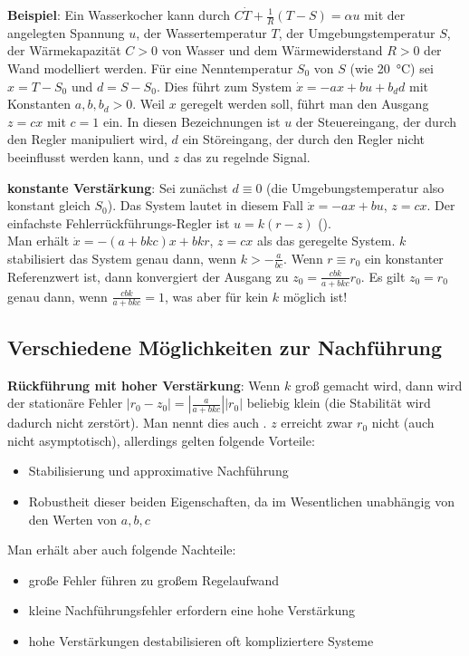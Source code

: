 \textbf{Beispiel}:
Ein Wasserkocher kann durch $C\dot{T} + \frac{1}{R} (T - S) = \alpha u$ mit
der angelegten Spannung $u$,
der Wassertemperatur $T$,
der Umgebungstemperatur $S$,
der Wärmekapazität $C > 0$ von Wasser und
dem Wärmewiderstand $R > 0$ der Wand modelliert werden.
Für eine Nenntemperatur $S_0$ von $S$ (wie \SI{20}{\celsius}) sei $x = T - S_0$ und $d = S - S_0$.
Dies führt zum System $\dot{x} = -ax + bu + b_d d$ mit Konstanten $a, b, b_d > 0$.
Weil $x$ geregelt werden soll, führt man den Ausgang $z = cx$ mit $c = 1$ ein.
In diesen Bezeichnungen ist
$u$ der Steuereingang, der durch den Regler manipuliert wird,
$d$ ein Störeingang, der durch den Regler nicht beeinflusst werden kann, und
$z$ das zu regelnde Signal.

\textbf{konstante Verstärkung}:
Sei zunächst $d \equiv 0$ (die Umgebungstemperatur also konstant gleich $S_0$).
Das System lautet in diesem Fall $\dot{x} = -ax + bu$, $z = cx$.
Der einfachste Fehlerrückführungs-Regler ist $u = k(r - z)$
().\\
Man erhält $\dot{x} = -(a + bkc)x + bkr$, $z = cx$ als das geregelte System.
$k$ stabilisiert das System genau dann, wenn $k > -\frac{a}{bc}$.
Wenn $r \equiv r_0$ ein konstanter Referenzwert ist, dann konvergiert der Ausgang zu
$z_0 = \frac{cbk}{a + bkc} r_0$.
Es gilt $z_0 = r_0$ genau dann, wenn $\frac{cbk}{a + bkc} = 1$, was aber für kein $k$ möglich ist!

\pagebreak

\subsection{%
    Verschiedene Möglichkeiten zur Nachführung%
}

\textbf{Rückführung mit hoher Verstärkung}:
Wenn $k$ groß gemacht wird, dann wird der stationäre Fehler
$|r_0 - z_0| = \left|\frac{a}{a + bkc}\right| |r_0|$ beliebig klein
(die Stabilität wird dadurch nicht zerstört).
Man nennt dies auch .
$z$ erreicht zwar $r_0$ nicht (auch nicht asymptotisch), allerdings gelten folgende Vorteile:
\begin{itemize}
    \item
    Stabilisierung und approximative Nachführung

    \item
    Robustheit dieser beiden Eigenschaften, da im Wesentlichen unabhängig von den Werten von
    $a, b, c$
\end{itemize}
Man erhält aber auch folgende Nachteile:
\begin{itemize}
    \item
    große Fehler führen zu großem Regelaufwand

    \item
    kleine Nachführungsfehler erfordern eine hohe Verstärkung

    \item
    hohe Verstärkungen destabilisieren oft kompliziertere Systeme
\end{itemize}

